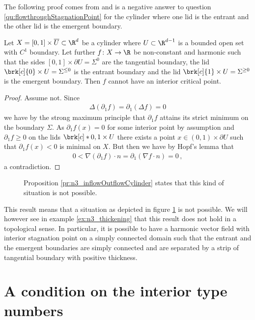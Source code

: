 The following proof comes from \cite{Wahlen2023} and is a negative answer to question \ref{qu:flowthroughStagnationPoint}
for the cylinder where one lid is the entrant and the other lid is the emergent boundary.
\begin{proposition}\label{pr:n3_inflowOutflowCylinder}
  Let $X=[0,1]\times \overline{U}\subset\R^d$ be a cylinder where $U\subset\R^{d-1}$ is a bounded open set with $C^1$ boundary.
  Let further $f\colon X\to\R$ be non-constant and
  harmonic such that the sides
  $[0,1]\times \partial U=\Sigma^0$ are the tangential boundary,
  the lid $\brk[c]{0}\times U=\Sigma^{\leq0}$ is the entrant boundary and
  the lid $\brk[c]{1}\times U=\Sigma^{\geq0}$ is the emergent boundary. 
  Then $f$ cannot have an interior critical point.
\end{proposition}
\begin{proof}
  Assume not. Since
  \begin{align*}
    \Delta(\partial_1f)=\partial_1(\Delta f)=0
  \end{align*}
  we have by the strong maximum principle that $\partial_1 f$ attains its strict minimum on the boundary $\Sigma$. As $\partial_1 f(x)=0$ for some interior point 
  by assumption and $\partial_1 f\geq0$ on the lids $\brk[c]*{0,1}\times U$ there exists a point
  $x\in(0,1)\times \partial U$ such that $\partial_1f(x)<0$ is minimal on $X$. But then we have by Hopf's lemma
  that
  \begin{align*}
    0<\nabla (\partial_1f)\cdot n=\partial_1(\nabla f\cdot n)=0\,,
  \end{align*}
  a contradiction.
\end{proof}
\begin{figure}
  \centering
  
  \caption{Proposition \ref{pr:n3_inflowOutflowCylinder} states that this kind of situation is not possible.}
  \label{fi:n3_cylinder}
\end{figure}
This result means that a situation as depicted in figure \ref{fi:n3_cylinder} is not possible. We will however see in example
\ref{ex:n3_thickening} that this result does not hold in a topological sense.
In particular, it is possible to have a harmonic vector field with interior stagnation point on a simply connected domain such that
the entrant and the emergent boundaries are simply connected and are separated by a strip of tangential boundary with positive thickness.

\section{A condition on the interior type numbers}

